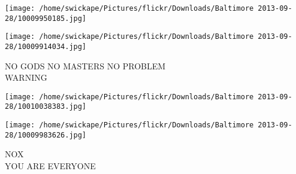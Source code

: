 \documentclass[10pt,letterpaper]{article}
\begin{document}
\texttt{[image: /home/swickape/Pictures/flickr/Downloads/Baltimore 2013-09-28/10009950185.jpg]}

\vspace{0.25in}
\texttt{[image: /home/swickape/Pictures/flickr/Downloads/Baltimore 2013-09-28/10009914034.jpg]}

NO GODS NO MASTERS NO PROBLEM\\
WARNING
\pagebreak

\texttt{[image: /home/swickape/Pictures/flickr/Downloads/Baltimore 2013-09-28/10010038383.jpg]}

\vspace{0.25in}
\texttt{[image: /home/swickape/Pictures/flickr/Downloads/Baltimore 2013-09-28/10009983626.jpg]}

NOX\\
YOU ARE EVERYONE
\pagebreak
\end{document}
